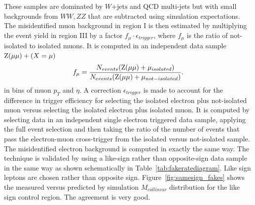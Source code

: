 \documentclass[oneside, letterpaper, oldfontcommands]{memoir}
\begin{document}
{{{These samples are dominated by $W\mathrm{+jets}$ and QCD multi-jets but with small backgrounds from $WW,ZZ$  that are subtracted using
simulation expectations. The misidentified  muon background in region I is then estimated by multiplying the event yield in region III by a
factor $f_{\mu}\cdot\epsilon_{trigger}$, where $f_{\mu}$ is the ratio
of not-isolated to isolated muons. It is computed in an independent data sample $\mathrm{Z}(\mu \mu) + (X=\mu)$
\begin{equation*}
f_{\mu}=\frac{ N_{events}(\mathrm{Z}(\mu \mu) + \mu_{isolated}) }{N_{events}(\mathrm{Z}(\mu \mu) + \mu_{not-isolated}) }.
\end{equation*}
in bins of muon $p_{T}$ and $\eta$. A correction $\epsilon_{trigger}$ is made to
account for the difference in trigger efficiency for selecting the isolated electron plus not-isolated
muon versus selecting the isolated electron plus isolated muon. It is computed by selecting data
in an independent single electron triggered data sample, applying the full event selection and then taking the
ratio of the number of events that pass the electron-muon cross-trigger from the isolated versus
not-isolated sample. The misidentified electron background is computed in exactly the same way.
The technique is validated by using a like-sign rather than opposite-sign data sample in
the same way as shown schematically  in Table~\ref{tab:fakeratediagram}. Like sign leptons are chosen rather than opposite sign.
Figure~\ref{fig:samesign_fakes} shows the measured  versus predicted by simulation $M_{collinear}$ distribution for the like sign control region. The agreement is very good.




}}}
\end{document}
